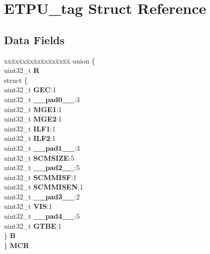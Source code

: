 \hypertarget{structETPU__tag}{}\section{E\+T\+P\+U\+\_\+tag Struct Reference}
\label{structETPU__tag}
\subsection*{Data Fields}
\begin{DoxyCompactItemize}
\item 
\mbox{\label{structETPU__tag_a2b0f078c18f94f1e8e7994b29df4725b}} 
\begin{tabbing}
xx\=xx\=xx\=xx\=xx\=xx\=xx\=xx\=xx\=\kill
union \{\\
\>uint32\_t {\bfseries R}\\
\>struct \{\\
\>\>uint32\_t {\bfseries GEC}:1\\
\>\>uint32\_t {\bfseries \_\_pad0\_\_}:3\\
\>\>uint32\_t {\bfseries MGE1}:1\\
\>\>uint32\_t {\bfseries MGE2}:1\\
\>\>uint32\_t {\bfseries ILF1}:1\\
\>\>uint32\_t {\bfseries ILF2}:1\\
\>\>uint32\_t {\bfseries \_\_pad1\_\_}:3\\
\>\>uint32\_t {\bfseries SCMSIZE}:5\\
\>\>uint32\_t {\bfseries \_\_pad2\_\_}:5\\
\>\>uint32\_t {\bfseries SCMMISF}:1\\
\>\>uint32\_t {\bfseries SCMMISEN}:1\\
\>\>uint32\_t {\bfseries \_\_pad3\_\_}:2\\
\>\>uint32\_t {\bfseries VIS}:1\\
\>\>uint32\_t {\bfseries \_\_pad4\_\_}:5\\
\>\>uint32\_t {\bfseries GTBE}:1\\
\>\} {\bfseries B}\\
\} {\bfseries MCR}\\


\end{tabbing}
\end{DoxyCompactItemize}
